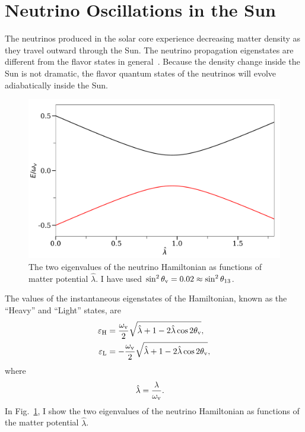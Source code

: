 \section{\label{chap:matter-sec:solar-neutrinos}Neutrino Oscillations in the Sun}



The neutrinos produced in the solar core experience decreasing matter density as they travel outward through the Sun. The neutrino propagation eigenstates are different from the flavor states in general~\cite{wolf78}.
Because the density change inside the Sun is not dramatic, the flavor quantum states of the neutrinos will evolve adiabatically inside the Sun.

\begin{figure}[htbp]
\centering
\includegraphics[width=0.7\columnwidth]{chapters/assets/matter/mswEnergyLevels}
\caption{The two eigenvalues of the neutrino Hamiltonian as functions of matter potential $\hat\lambda$. I have used $\sin^2\theta_\mathrm v = 0.02 \approx \sin^2 \theta_{13}$.}
\label{fig:mswEnergyLevels}
\end{figure}

The values of the instantaneous eigenstates of the Hamiltonian, known as the ``Heavy'' and ``Light'' states, are
\begin{align}
\varepsilon_{\mathrm H} &= \frac{\omega_\mathrm v}{2}\sqrt{ \hat\lambda +1 -  2\hat\lambda \cos 2\theta_\mathrm v }, \\
\varepsilon_{\mathrm L} &= -\frac{\omega_\mathrm v}{2}\sqrt{ \hat\lambda +1 -  2\hat\lambda \cos 2\theta_\mathrm v },
\end{align}
where
\begin{align}
\hat\lambda & = \frac{\lambda}{\omega_\mathrm v}.
\end{align}
In Fig.~\ref{fig:mswEnergyLevels}, I show the two eigenvalues of the neutrino Hamiltonian as functions of the matter potential $\hat \lambda$.

